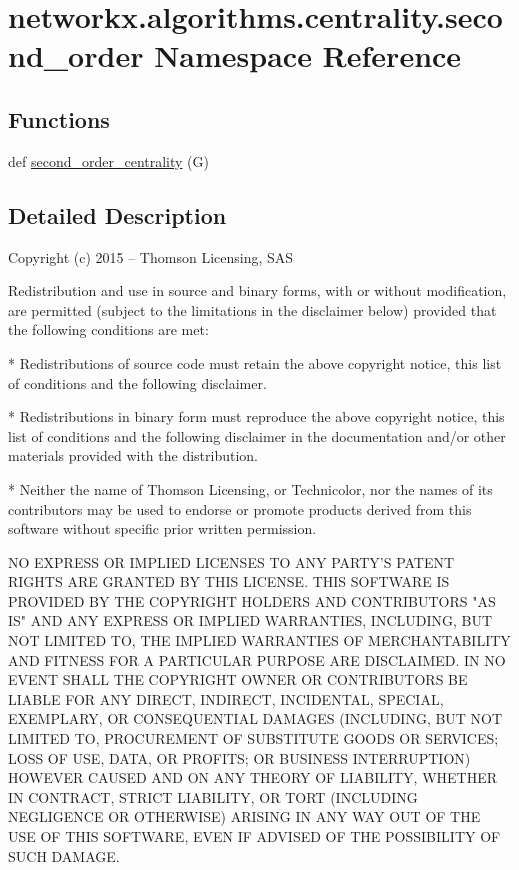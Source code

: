 \hypertarget{namespacenetworkx_1_1algorithms_1_1centrality_1_1second__order}{}\section{networkx.\+algorithms.\+centrality.\+second\+\_\+order Namespace Reference}
\label{namespacenetworkx_1_1algorithms_1_1centrality_1_1second__order}
\subsection*{Functions}
\begin{DoxyCompactItemize}
\item 
def \hyperlink{namespacenetworkx_1_1algorithms_1_1centrality_1_1second__order_a669aac0f3f0887385eb1f94109efe7d1}{second\+\_\+order\+\_\+centrality} (G)
\end{DoxyCompactItemize}


\subsection{Detailed Description}
\begin{DoxyVerb}Copyright (c) 2015 – Thomson Licensing, SAS

Redistribution and use in source and binary forms, with or without
modification, are permitted (subject to the limitations in the
disclaimer below) provided that the following conditions are met:

* Redistributions of source code must retain the above copyright
notice, this list of conditions and the following disclaimer.

* Redistributions in binary form must reproduce the above copyright
notice, this list of conditions and the following disclaimer in the
documentation and/or other materials provided with the distribution.

* Neither the name of Thomson Licensing, or Technicolor, nor the names
of its contributors may be used to endorse or promote products derived
from this software without specific prior written permission.

NO EXPRESS OR IMPLIED LICENSES TO ANY PARTY'S PATENT RIGHTS ARE
GRANTED BY THIS LICENSE.  THIS SOFTWARE IS PROVIDED BY THE COPYRIGHT
HOLDERS AND CONTRIBUTORS "AS IS" AND ANY EXPRESS OR IMPLIED
WARRANTIES, INCLUDING, BUT NOT LIMITED TO, THE IMPLIED WARRANTIES OF
MERCHANTABILITY AND FITNESS FOR A PARTICULAR PURPOSE ARE
DISCLAIMED. IN NO EVENT SHALL THE COPYRIGHT OWNER OR CONTRIBUTORS BE
LIABLE FOR ANY DIRECT, INDIRECT, INCIDENTAL, SPECIAL, EXEMPLARY, OR
CONSEQUENTIAL DAMAGES (INCLUDING, BUT NOT LIMITED TO, PROCUREMENT OF
SUBSTITUTE GOODS OR SERVICES; LOSS OF USE, DATA, OR PROFITS; OR
BUSINESS INTERRUPTION) HOWEVER CAUSED AND ON ANY THEORY OF LIABILITY,
WHETHER IN CONTRACT, STRICT LIABILITY, OR TORT (INCLUDING NEGLIGENCE
OR OTHERWISE) ARISING IN ANY WAY OUT OF THE USE OF THIS SOFTWARE, EVEN
IF ADVISED OF THE POSSIBILITY OF SUCH DAMAGE.
\end{DoxyVerb}
 

